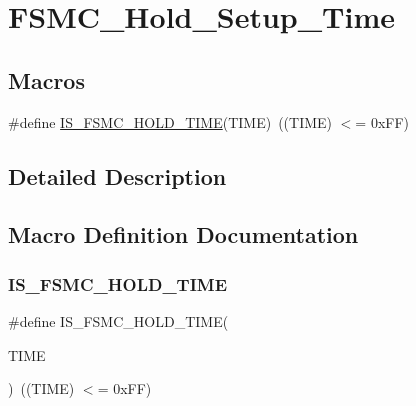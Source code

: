 \hypertarget{group___f_s_m_c___hold___setup___time}{}\section{F\+S\+M\+C\+\_\+\+Hold\+\_\+\+Setup\+\_\+\+Time}
\label{group___f_s_m_c___hold___setup___time}
\subsection*{Macros}
\begin{DoxyCompactItemize}
\item 
\#define \mbox{\hyperlink{group___f_s_m_c___hold___setup___time_gab2abc8eb967495f2a2bafec8162d6385}{I\+S\+\_\+\+F\+S\+M\+C\+\_\+\+H\+O\+L\+D\+\_\+\+T\+I\+ME}}(T\+I\+ME)~((T\+I\+ME) $<$= 0x\+F\+F)
\end{DoxyCompactItemize}


\subsection{Detailed Description}


\subsection{Macro Definition Documentation}
\mbox{\label{group___f_s_m_c___hold___setup___time_gab2abc8eb967495f2a2bafec8162d6385}} 
\subsubsection{\texorpdfstring{IS\_FSMC\_HOLD\_TIME}{IS\_FSMC\_HOLD\_TIME}}
{\footnotesize\ttfamily \#define I\+S\+\_\+\+F\+S\+M\+C\+\_\+\+H\+O\+L\+D\+\_\+\+T\+I\+ME(\begin{DoxyParamCaption}\item[{}]{T\+I\+ME }\end{DoxyParamCaption})~((T\+I\+ME) $<$= 0x\+F\+F)}

